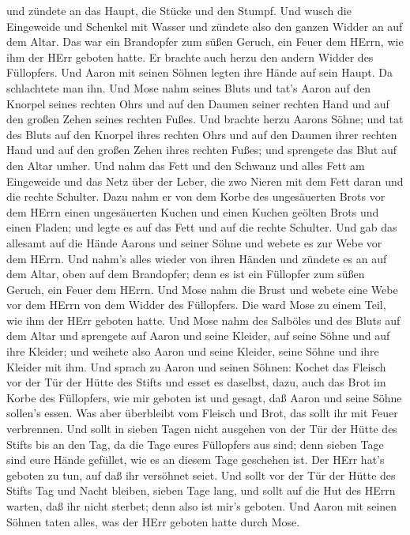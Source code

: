 und zündete an das Haupt, die Stücke und den Stumpf.  Und
wusch die Eingeweide und Schenkel mit Wasser und zündete also den ganzen
Widder an auf dem Altar. Das war ein Brandopfer zum süßen Geruch, ein
Feuer dem HErrn, wie ihm der HErr geboten hatte.  Er
brachte auch herzu den andern Widder des Füllopfers. Und Aaron mit
seinen Söhnen legten ihre Hände auf sein Haupt.  Da
schlachtete man ihn. Und Mose nahm seines Bluts und tat's Aaron auf den
Knorpel seines rechten Ohrs und auf den Daumen seiner rechten Hand und
auf den großen Zehen seines rechten Fußes.  Und brachte
herzu Aarons Söhne; und tat des Bluts auf den Knorpel ihres rechten Ohrs
und auf den Daumen ihrer rechten Hand und auf den großen Zehen ihres
rechten Fußes; und sprengete das Blut auf den Altar umher. 
Und nahm das Fett und den Schwanz und alles Fett am Eingeweide und das
Netz über der Leber, die zwo Nieren mit dem Fett daran und die rechte
Schulter.  Dazu nahm er von dem Korbe des ungesäuerten
Brots vor dem HErrn einen ungesäuerten Kuchen und einen Kuchen geölten
Brots und einen Fladen; und legte es auf das Fett und auf die rechte
Schulter.  Und gab das allesamt auf die Hände Aarons und
seiner Söhne und webete es zur Webe vor dem HErrn.  Und
nahm's alles wieder von ihren Händen und zündete es an auf dem Altar,
oben auf dem Brandopfer; denn es ist ein Füllopfer zum süßen Geruch, ein
Feuer dem HErrn.  Und Mose nahm die Brust und webete eine
Webe vor dem HErrn von dem Widder des Füllopfers. Die ward Mose zu einem
Teil, wie ihm der HErr geboten hatte.  Und Mose nahm des
Salböles und des Bluts auf dem Altar und sprengete auf Aaron und seine
Kleider, auf seine Söhne und auf ihre Kleider; und weihete also Aaron
und seine Kleider, seine Söhne und ihre Kleider mit ihm. 
Und sprach zu Aaron und seinen Söhnen: Kochet das Fleisch vor der Tür
der Hütte des Stifts und esset es daselbst, dazu, auch das Brot im Korbe
des Füllopfers, wie mir geboten ist und gesagt, daß Aaron und seine
Söhne sollen's essen.  Was aber überbleibt vom Fleisch und
Brot, das sollt ihr mit Feuer verbrennen.  Und sollt in
sieben Tagen nicht ausgehen von der Tür der Hütte des Stifts bis an den
Tag, da die Tage eures Füllopfers aus sind; denn sieben Tage sind eure
Hände gefüllet,  wie es an diesem Tage geschehen ist. Der
HErr hat's geboten zu tun, auf daß ihr versöhnet seiet. 
Und sollt vor der Tür der Hütte des Stifts Tag und Nacht bleiben, sieben
Tage lang, und sollt auf die Hut des HErrn warten, daß ihr nicht
sterbet; denn also ist mir's geboten.  Und Aaron mit seinen
Söhnen taten alles, was der HErr geboten hatte durch Mose.

